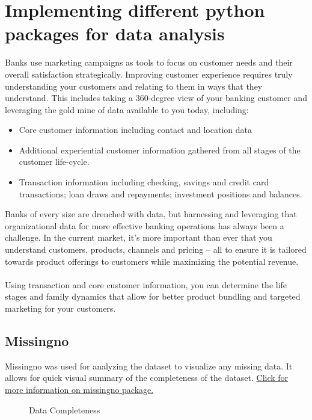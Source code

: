 \documentclass[12pt]{article}
\begin{document}
\section{Implementing different python packages for data analysis}
Banks use marketing campaigns as tools to focus on customer needs and their overall satisfaction strategically. Improving customer experience requires truly understanding your customers and relating to them in ways that they understand. This includes taking a 360-degree view of your banking customer and leveraging the gold mine of data available to you today, including: 
\begin{itemize}

\item Core customer information including contact and location data
\item Additional experiential customer information gathered from all stages of the customer life-cycle.
\item Transaction information including checking, savings and credit card transactions; loan draws and repayments; investment positions and balances. 

\end{itemize}
Banks of every size are drenched with data, but harnessing and leveraging that organizational data for more effective banking operations has always been a challenge. In the current market, it’s more important than ever that you understand customers, products, channels and pricing – all to ensure it is tailored towards product offerings to customers while maximizing the potential revenue.\\\\
Using transaction and core customer information, you can determine the life stages and family dynamics that allow for better product bundling and targeted marketing for your customers.
\newpage
\subsection{Missingno}
Missingno was used for analyzing the dataset to visualize any missing data. It allows for  quick visual summary of the completeness of the dataset.  \href{https://github.com/ResidentMario/missingno}{Click for more information on missingno package.} 

\begin{figure}[!htbp]
	\centering
{}
	\caption{Data Completeness}
\end{figure}
\end{document}
